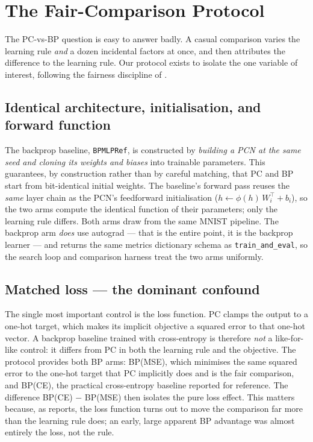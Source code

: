 \section{The Fair-Comparison Protocol}\label{sec:protocol}

The PC-vs-BP question is easy to answer badly. A casual comparison varies the learning rule \emph{and}
a dozen incidental factors at once, and then attributes the difference to the learning rule. Our
protocol exists to isolate the one variable of interest, following the fairness discipline of
\citet{song2024prospective}.

\subsection{Identical architecture, initialisation, and forward function}

The backprop baseline, \texttt{BPMLPRef}, is constructed by \emph{building a PCN at the same seed and
cloning its weights and biases} into trainable parameters. This guarantees, by construction rather than
by careful matching, that PC and BP start from bit-identical initial weights. The baseline's forward
pass reuses the \emph{same} layer chain as the PCN's feedforward initialisation
($h \gets \phi(h)\,W_i^{\!\top} + b_i$), so the two arms compute the identical function of their
parameters; only the learning rule differs. Both arms draw from the same MNIST pipeline. The backprop
arm \emph{does} use autograd --- that is the entire point, it is the backprop learner --- and returns
the same metrics dictionary schema as \texttt{train\_and\_eval}, so the search loop and comparison
harness treat the two arms uniformly.

\subsection{Matched loss --- the dominant confound}

The single most important control is the loss function. PC clamps the output to a one-hot target, which
makes its implicit objective a squared error to that one-hot vector. A backprop baseline trained with
cross-entropy is therefore \emph{not} a like-for-like control: it differs from PC in both the learning
rule and the objective. The protocol provides both BP arms: BP(MSE), which minimises the same squared
error to the one-hot target that PC implicitly does and is the fair comparison, and BP(CE), the
practical cross-entropy baseline reported for reference. The difference BP(CE) $-$ BP(MSE) then isolates
the pure loss effect. This matters because, as  reports, the loss function turns out
to move the comparison far more than the learning rule does; an early, large apparent BP advantage was
almost entirely the loss, not the rule.

